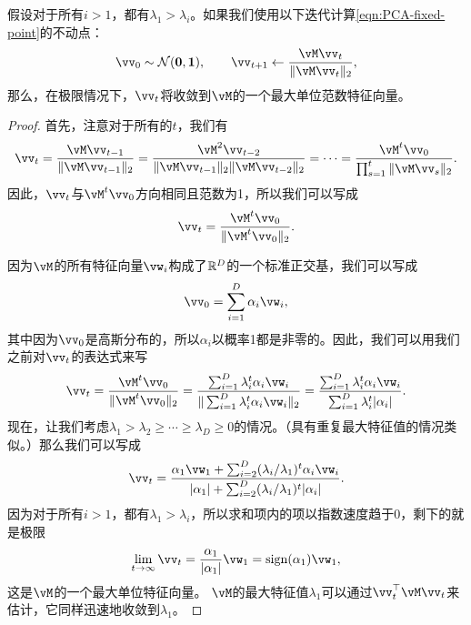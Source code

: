 \documentclass[../../book-main.tex]{subfiles}
\begin{document}
\begin{theorem}[幂迭代]
假设对于所有\(i > 1\)，都有\(\lambda_{1} > \lambda_{i}\)。如果我们使用以下迭代计算\eqref{eqn:PCA-fixed-point}的不动点：
\begin{equation}\label{eq:power_iteration}
    \vv_{0} \sim \dNorm(\vzero, \vone), \qquad \vv_{t + 1} \gets \frac{\vM\vv_{t}}{\norm{\vM\vv_{t}}_{2}},
\end{equation}
那么，在极限情况下，\(\vv_{t}\)将收敛到\(\vM\)的一个最大单位范数特征向量。
\end{theorem}

\begin{proof} 首先，注意对于所有的\(t\)，我们有
\begin{equation}
    \vv_{t} = \frac{\vM\vv_{t - 1}}{\norm{\vM\vv_{t - 1}}_{2}} = \frac{\vM^{2}\vv_{t - 2}}{\norm{\vM\vv_{t - 1}}_{2}\norm{\vM\vv_{t - 2}}_{2}} = \cdots = \frac{\vM^{t}\vv_{0}}{\prod_{s = 1}^{t}\norm{\vM\vv_{s}}_{2}}.
\end{equation}
因此，\(\vv_{t}\)与\(\vM^{t}\vv_{0}\)方向相同且范数为1，所以我们可以写成
\begin{equation}
    \vv_{t} = \frac{\vM^{t}\vv_{0}}{\norm{\vM^{t}\vv_{0}}_{2}}.
\end{equation}

因为$\vM$的所有特征向量\(\vw_{i}\)构成了\(\mathbb{R}^{D}\)的一个标准正交基，我们可以写成
\begin{equation}
    \vv_{0} = \sum_{i = 1}^{D}\alpha_{i}\vw_{i},
\end{equation}
其中因为\(\vv_{0}\)是高斯分布的，所以\(\alpha_{i}\)以概率1都是非零的。因此，我们可以用我们之前对\(\vv_{t}\)的表达式来写
\begin{equation}
    \vv_{t} = \frac{\vM^{t}\vv_{0}}{\norm{\vM^{t}\vv_{0}}_{2}} = \frac{\sum_{i = 1}^{D}\lambda_{i}^{t}\alpha_{i}\vw_{i}}{\norm{\sum_{i = 1}^{D}\lambda_{i}^{t}\alpha_{i}\vw_{i}}_{2}} = \frac{\sum_{i = 1}^{D}\lambda_{i}^{t}\alpha_{i}\vw_{i}}{\sum_{i = 1}^{D}\lambda_{i}^{t}\abs{\alpha_{i}}}. 
\end{equation}
现在，让我们考虑\(\lambda_{1} > \lambda_{2} \geq \cdots \geq \lambda_{D} \geq 0\)的情况。（具有重复最大特征值的情况类似。）那么我们可以写成
\begin{equation}
    \vv_{t} = \frac{\alpha_{1}\vw_{1} + \sum_{i = 2}^{D}(\lambda_{i}/\lambda_{1})^{t}\alpha_{i}\vw_{i}}{\abs{\alpha_{1}} + \sum_{i = 2}^{D}(\lambda_{i}/\lambda_{1})^{t}\abs{\alpha_{i}}}.
\end{equation}
因为对于所有\(i > 1\)，都有\(\lambda_{1} > \lambda_{i}\)，所以求和项内的项以指数速度趋于\(0\)，剩下的就是极限
\begin{equation}
    \lim_{t \to \infty}\vv_{t} = \frac{\alpha_{1}}{\abs{\alpha_{1}}}\vw_{1} = \sign(\alpha_{1})\vw_{1},
\end{equation}
这是\(\vM\)的一个最大单位特征向量。 \(\vM\)的最大特征值\(\lambda_{1}\)可以通过\(\vv_{t}^{\top}\vM\vv_{t}\)来估计，它同样迅速地收敛到\(\lambda_{1}\)。
\end{proof}
\end{document}
